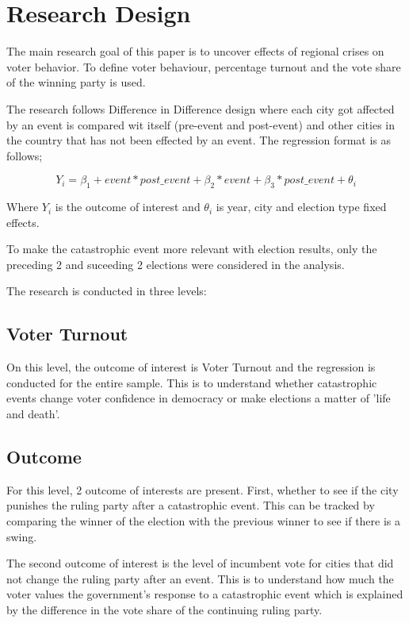 \documentclass[12pt]{article}
\begin{document}
\section{Research Design}

The main research goal of this paper is to uncover effects of regional crises on voter behavior. To define voter behaviour, percentage turnout and the vote share of the winning party is used. 

The research follows Difference in Difference design where each city got affected by an event is compared wit itself (pre-event and post-event) and other cities in the country that has not been effected by an event. The regression format is as follows;

$$ Y_i = \beta_{1} + {event * post\_event} + \beta_{2} * {event} + \beta_{3} * {post\_event} + \theta_i$$

Where $Y_i$ is the outcome of interest and $\theta_i$ is year, city and election type fixed effects.

To make the catastrophic event more relevant with election results, only the preceding 2 and suceeding 2 elections were considered in the analysis.

The research is conducted in three levels:

\subsection{Voter Turnout}

On this level, the outcome of interest is Voter Turnout and the regression is conducted for the entire sample. This is to understand whether catastrophic events change voter confidence in democracy or make elections a matter of 'life and death'.

\subsection{Outcome}

For this level, 2 outcome of interests are present. First, whether to see if the city punishes the ruling party after a catastrophic event. This can be tracked by comparing the winner of the election with the previous winner to see if there is a swing.

The second outcome of interest is the level of incumbent vote for cities that did not change the ruling party after an event. This is to understand how much the voter values the government's response to a catastrophic event which is explained by the difference in the vote share of the continuing ruling party.
\end{document}
